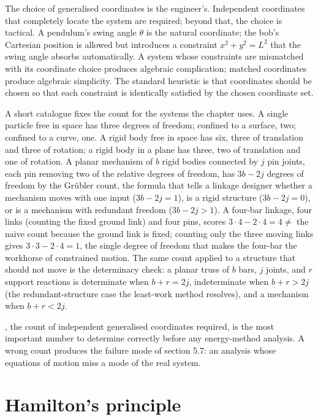 The choice of generalised coordinates is the engineer's. Independent
coordinates that completely locate the system are required; beyond
that, the choice is tactical. A pendulum's swing angle $\theta$ is
the natural coordinate; the bob's Cartesian position is allowed but
introduces a constraint $x^2 + y^2 = L^2$ that the swing angle
absorbs automatically. A system whose constraints are mismatched
with its coordinate choice produces algebraic complication; matched
coordinates produce algebraic simplicity. The standard heuristic is
that coordinates should be chosen so that each constraint is
identically satisfied by the chosen coordinate set.

A short catalogue fixes the count for the systems the chapter uses. A
single particle free in space has three degrees of freedom; confined to a
surface, two; confined to a curve, one. A rigid body free in space has six,
three of translation and three of rotation; a rigid body in a plane has
three, two of translation and one of rotation. A planar mechanism of $b$
rigid bodies connected by $j$ pin joints, each pin removing two of the
relative degrees of freedom, has $3b - 2j$ degrees of freedom by the
Gr\"ubler count, the formula that tells a linkage designer whether a
mechanism moves with one input ($3b - 2j = 1$), is a rigid structure
($3b - 2j = 0$), or is a mechanism with redundant freedom ($3b - 2j > 1$).
A four-bar linkage, four links (counting the fixed ground link) and four
pins, scores $3\cdot 4 - 2\cdot 4 = 4 \ne$ the naive count because the
ground link is fixed; counting only the three moving links gives $3\cdot 3 -
2\cdot 4 = 1$, the single degree of freedom that makes the four-bar the
workhorse of constrained motion. The same count applied to a structure that
should not move is the determinacy check: a planar truss of $b$ bars, $j$
joints, and $r$ support reactions is determinate when $b + r = 2j$,
indeterminate when $b + r > 2j$ (the redundant-structure case the least-work
method resolves), and a mechanism when $b + r < 2j$.

, the count of independent generalised
coordinates required, is the most important number to determine
correctly before any energy-method analysis. A wrong count produces
the failure mode of section 5.7: an analysis whose equations of
motion miss a mode of the real system.

\section{Hamilton's principle}

